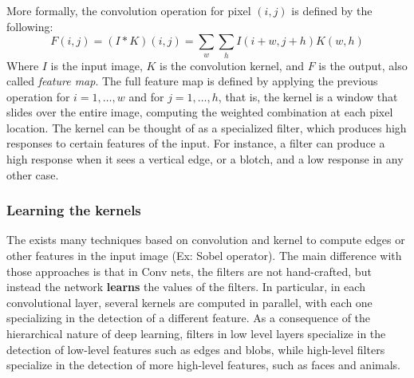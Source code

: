 \documentclass[../main.tex]{subfiles}
\begin{document}

    More formally, the convolution operation for pixel $(i, j)$ is defined by the following:
    \begin{equation}
        F(i, j) = (I \ast K)(i, j) = \sum_{w} \sum_{h} I(i + w, j + h) K(w, h)
    \end{equation}
    Where $I$ is the input image, $K$ is the convolution kernel, and $F$ is the output, also called \textit{feature map}. The full
    feature map is defined by applying the previous operation for $i = 1, \ldots, w$ and for $j = 1, \ldots, h$, that is, the kernel
    is a window that slides over the entire image, computing the weighted combination at each pixel location. The kernel can be thought
    of as a specialized filter, which produces high responses to certain features of the input. For instance, a filter can produce a
    high response when it sees a vertical edge, or a blotch, and a low response in any other case.

    \subsubsection{Learning the kernels}
    The exists many techniques based on convolution and kernel to compute edges or other features in the input image (Ex: Sobel operator).
    The main difference with those approaches is that in Conv nets, the filters are not hand-crafted, but instead the network \textbf{learns}
    the values of the filters. In particular, in each convolutional layer, several kernels are computed in parallel, with each one specializing
    in the detection of a different feature. As a consequence of the hierarchical nature of deep learning, filters in low level layers specialize
    in the detection of low-level features such as edges and blobs, while high-level filters specialize in the detection of more high-level features,
    such as faces and animals.
\end{document}
